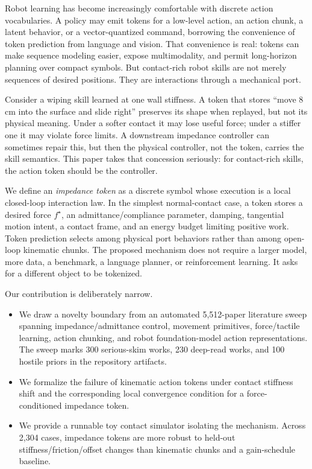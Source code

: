 \documentclass{article}
\newcommand{\ftarget}{f^\star}
\begin{document}
Robot learning has become increasingly comfortable with discrete action vocabularies. A policy may emit tokens for a low-level action, an action chunk, a latent behavior, or a vector-quantized command, borrowing the convenience of token prediction from language and vision. That convenience is real: tokens can make sequence modeling easier, expose multimodality, and permit long-horizon planning over compact symbols. But contact-rich robot skills are not merely sequences of desired positions. They are interactions through a mechanical port.

Consider a wiping skill learned at one wall stiffness. A token that stores ``move 8 cm into the surface and slide right'' preserves its shape when replayed, but not its physical meaning. Under a softer contact it may lose useful force; under a stiffer one it may violate force limits. A downstream impedance controller can sometimes repair this, but then the physical controller, not the token, carries the skill semantics. This paper takes that concession seriously: for contact-rich skills, the action token should be the controller.

We define an \emph{impedance token} as a discrete symbol whose execution is a local closed-loop interaction law. In the simplest normal-contact case, a token stores a desired force $\ftarget$, an admittance/compliance parameter, damping, tangential motion intent, a contact frame, and an energy budget limiting positive work. Token prediction selects among physical port behaviors rather than among open-loop kinematic chunks. The proposed mechanism does not require a larger model, more data, a benchmark, a language planner, or reinforcement learning. It asks for a different object to be tokenized.

Our contribution is deliberately narrow.
\begin{itemize}
    \item We draw a novelty boundary from an automated 5,512-paper literature sweep spanning impedance/admittance control, movement primitives, force/tactile learning, action chunking, and robot foundation-model action representations. The sweep marks 300 serious-skim works, 230 deep-read works, and 100 hostile priors in the repository artifacts.
    \item We formalize the failure of kinematic action tokens under contact stiffness shift and the corresponding local convergence condition for a force-conditioned impedance token.
    \item We provide a runnable toy contact simulator isolating the mechanism. Across 2,304 cases, impedance tokens are more robust to held-out stiffness/friction/offset changes than kinematic chunks and a gain-schedule baseline.
\end{itemize}
\end{document}
